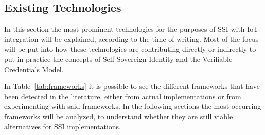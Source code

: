 \newpage

\subsection{Existing Technologies}
\label{subsec:existing_technologies_and_application_domains}

In this section the most prominent technologies for the purposes of SSI with IoT integration will be explained, according to the time of writing. Most of the focus will be put into how these technologies are contributing directly or indirectly to put in practice the concepts of Self-Sovereign Identity and the Verifiable Credentials Model.

In Table~\ref{tab:frameworks} it is possible to see the different frameworks that have been detected in the literature, either from actual implementations or from experimenting with said frameworks. In the following sections the most occurring frameworks will be analyzed, to understand whether they are still viable alternatives for SSI implementations.

